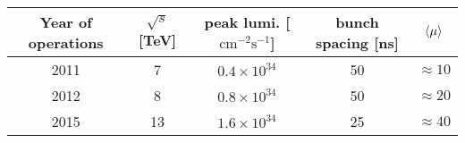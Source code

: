\begin{tabular}{c|cccc}
  \hline\hline
  Year of operations      & $\sqrt{s}$ [TeV] & peak lumi. [$\text{cm}^{-2} \text{s}^{-1}$] & bunch spacing [ns] & $\langle\mu\rangle$    \\
  \hline
  2011                    &  7               & $0.4\times 10^{34}$                         & 50                 & $\approx\! 10$ \\
  2012                    &  8               & $0.8\times 10^{34}$                         & 50                 & $\approx\! 20$ \\
  2015                    & 13               & $1.6\times 10^{34}$                         & 25                 & $\approx\! 40$ \\
  \hline\hline
\end{tabular}

